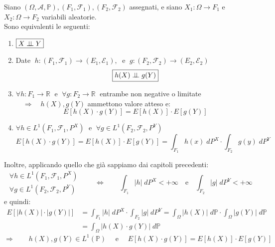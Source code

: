 \begin{teorema}
\label{th:condind}
    Siano $(\Omega, \mathcal{A}, \mathbb{P}), (F_1, \mathcal{F}_1),  (F_2, \mathcal{F}_2)$ assegnati, e siano $X_1:\Omega\to F_1$ e $X_2:\Omega\to F_2$ variabili aleatorie.\\
    Sono equivalenti le seguenti:
    \begin{enumerate}
        \item $\boxed{X\mathrel{\perp\!\!\!\perp} Y}$
        \item Date $\;h:(F_1, \mathcal{F}_1)\to (E_1, \mathcal{E}_1),\;$ e $ \; g:(F_2, \mathcal{F}_2)\to(E_2, \mathcal{E}_2)$ \[\boxed{h(X)\mathrel{\perp\!\!\!\perp} g(Y)}\]
        \item $\forall h:F_1\to \mathbb{R}\;\text{ e }\; \forall g:F_2\to \mathbb{R}\;$ entrambe non negative o limitate $\quad \Rightarrow\quad h(X), g(Y)$ ammettono valore atteso e:
        \[\boxed{E\left[h(X)\cdot g(Y)\right] = E\left[h(X)\right]\cdot E\left[g(Y)\right]}\]
        \item $\forall h\in L^1(F_1, \mathcal{F}_1, P^X)\;\text{ e }\;\forall g\in L^1(F_2, \mathcal{F}_2, P^Y)$
        \[\boxed{E\left[h(X)\cdot g(Y)\right] = E\left[h(X)\right]\cdot E\left[g(Y)\right] = \int_{F_1}h(x)\;dP^X \cdot \int_{F_2}g(y)\;dP^Y}\]
    \end{enumerate}
\end{teorema}

\noindent Inoltre, applicando quello che già sappiamo dai capitoli precedenti:
\[\begin{aligned}
    \forall h\in L^1(F_1, \mathcal{F}_1, P^X)\\
    \forall g\in L^1(F_2, \mathcal{F}_2, P^Y)
\end{aligned} \qquad \iff \qquad \int_{F_1}|h|\;dP^X<+\infty \quad \text{e}\quad \int_{F_2}|g|\;dP^Y<+\infty\]
e quindi:
\begin{align*}
    E\left[\left|h(X)\right|\cdot \left|g(Y)\right|\right] &=  \int_{F_1}|h|\;dP^X \cdot \int_{F_2}|g|\;dP^Y = \int_{\Omega}|h(X)|\;d\mathbb{P}\cdot\int_{\Omega}|g(Y)|\;d\mathbb{P}\\
    & = \int_\Omega |h(X)\cdot g(Y)|\;d\mathbb{P}
\end{align*}
\[\Rightarrow \qquad h(X), g(Y)\in L^1(\mathbb{P})\quad\text{ e }\quad E[h(X)\cdot g(Y)] = E[h(X)]\cdot E[g(Y)]\]

